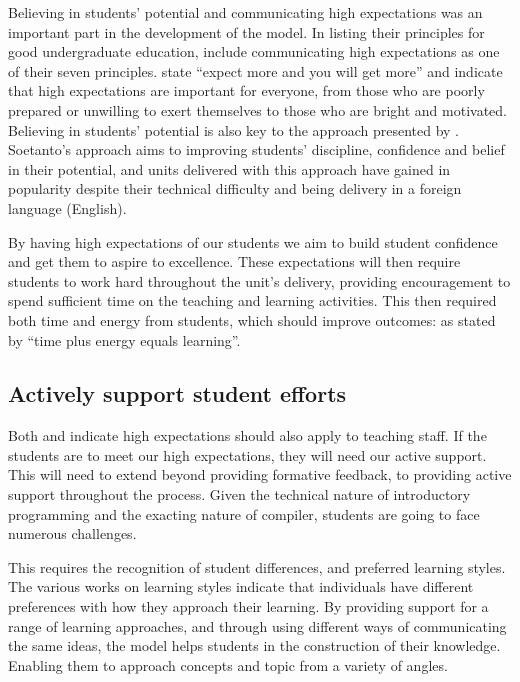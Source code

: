 Believing in students' potential and communicating high expectations was an important part in the development of the model. In listing their principles for good undergraduate education, \citet{Chickering:1987} include communicating high expectations as one of their seven principles. \citet{Chickering:1987} state ``expect more and you will get more'' and indicate that high expectations are important for everyone, from those who are poorly prepared or unwilling to exert themselves to those who are bright and motivated. Believing in students' potential is also key to the approach presented by \citet{Soetanto:2003,Soetanto:2012}. Soetanto's approach aims to improving students' discipline, confidence and belief in their potential, and units delivered with this approach have gained in popularity despite their technical difficulty and being delivery in a foreign language (English).

By having high expectations of our students we aim to build student confidence and get them to aspire to excellence. These expectations will then require students to work hard throughout the unit's delivery, providing encouragement to spend sufficient time on the teaching and learning activities. This then required both time and energy from students, which should improve outcomes: as stated by \citet{Chickering:1987} ``time plus energy equals learning''.


\subsection{Actively support student efforts} %
\label{ssub:actively_support_student_efforts}

Both \citet{Chickering:1987} and \citet{Soetanto:2003,Soetanto:2012} indicate high expectations should also apply to teaching staff. If the students are to meet our high expectations, they will need our active support. This will need to extend beyond providing formative feedback, to providing active support throughout the process. Given the technical nature of introductory programming and the exacting nature of compiler, students are going to face numerous challenges.

This requires the recognition of student differences, and preferred learning styles. The various works on learning styles \cite{Coffield:2004} indicate that individuals have different preferences with how they approach their learning. By providing support for a range of learning approaches, and through using different ways of communicating the same ideas, the model helps students in the construction of their knowledge. Enabling them to approach concepts and topic from a variety of angles.

